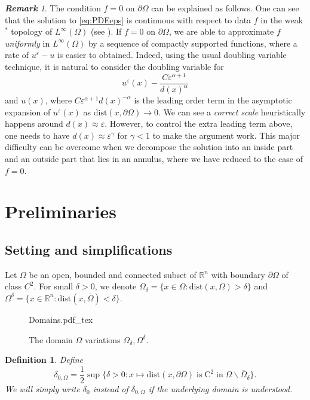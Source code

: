 \documentclass[11pt,reqno]{amsart}
\numberwithin{figure}{section}
\theoremstyle{plain}
\newtheorem{defn}{Definition}
\theoremstyle{remark}
\newtheorem{rem}{\bf{Remark}}
\numberwithin{equation}{section}
\newcommand{\rmC}{\mathrm{C}}
\newcommand{\incfig}[1]{%
    \def\svgwidth{\columnwidth}
    {#1.pdf_tex}
}
\begin{document}
\begin{rem} The condition $f = 0$ on $\partial\Omega$ can be explained as follows. One can see that the solution to \eqref{eq:PDEeps} is continuous with respect to data $f$ in the weak$^*$ topology of $L^\infty(\Omega)$ (see \cite{Lasry1989}). If $f = 0$ on $\partial\Omega$, we are able to approximate $f$ \emph{uniformly} in $L^\infty(\Omega)$ by a sequence of compactly supported functions, where a rate of $u^\varepsilon-u$ is easier to obtained. Indeed, using the usual doubling variable technique, it is natural to consider the doubling variable for
\begin{equation*}
    u^\varepsilon(x) - \frac{C\varepsilon^{\alpha+1}}{d(x)^{\alpha}}
\end{equation*}
and $u(x)$, where $C\varepsilon^{\alpha+1}d(x)^{-\alpha}$ is the leading order term in the asymptotic expansion of $u^\varepsilon(x)$ as $\mathrm{dist}(x,\partial\Omega)\to 0$. We can see a \emph{correct scale} heuristically happens around $d(x) \approx \varepsilon$. However, to control the extra leading term above, one needs to have $d(x)\approx \varepsilon^\gamma$ for $\gamma < 1$ to make the argument work. This major difficulty can be overcome when we decompose the solution into an inside part and an outside part that lies in an annulus, where we have reduced to the case of $f=0$.
\end{rem}

\section{Preliminaries}\label{sec:prelim} 
\subsection{Setting and simplifications} Let $\Omega$ be an open, bounded and connected subset of $\mathbb{R}^n$ with boundary $\partial\Omega$ of class $C^2$. For small $\delta>0$, we denote $\Omega_\delta = \{x\in \Omega: \mathrm{dist}(x,\Omega) > \delta\}$ and $\Omega^\delta = \{x\in \mathbb{R}^n: \mathrm{dist}(x,\overline{\Omega}) < \delta\}$. 
\begin{figure}[ht]
    \centering
    \def\svgwidth{0.47\columnwidth}
    {Domains.pdf_tex}
    \caption{The domain $\Omega$ variations $\Omega_\delta, \Omega^\delta$.}
    \label{fig:Domains}
\end{figure}

\begin{defn} Define
\begin{equation}\label{def:delta_0}
    \delta_{0,\Omega} =\frac{1}{2}\sup \big\{ \delta > 0: x\mapsto\mathrm{dist}(x,\partial\Omega)\;\text{is}\;\rmC^2\;\text{in}\;\Omega\backslash\overline{\Omega}_{\delta} \big\}.
\end{equation}
We will simply write $\delta_0$ instead of $\delta_{0,\Omega}$ if the underlying domain is understood.
\end{defn}
\end{document}
